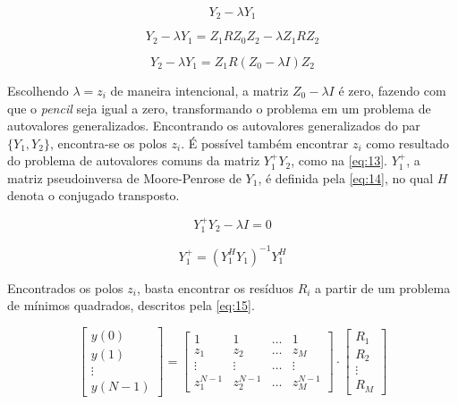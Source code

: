 \documentclass[12pt]{article}
\begin{document}
\begin{equation} \label{eq:10}
    Y_2 - \lambda Y_1
\end{equation}

\begin{equation} \label{eq:11}
    Y_2 - \lambda Y_1 = Z_1 R Z_0 Z_2 - \lambda Z_1 R Z_2
\end{equation}

\begin{equation} \label{eq:12}
    Y_2 - \lambda Y_1 = Z_1 R (Z_0 - \lambda I) Z_2
\end{equation}

Escolhendo $\lambda = z_i$ de maneira intencional, a matriz $Z_0 - \lambda I$ é zero, fazendo com que o \textit{pencil} seja igual a zero, transformando o problema em um problema de autovalores generalizados. 
Encontrando os autovalores generalizados do par $\{Y_1, Y_2\}$, encontra-se os polos $z_i$. É possível também encontrar $z_i$ como resultado do problema de autovalores comuns da matriz $Y_1^+ Y_2$, como na
\autoref{eq:13}. $Y_1^+$, a matriz pseudoinversa de Moore-Penrose de $Y_1$, é definida pela \autoref{eq:14}, no qual $H$ denota o conjugado transposto. 

\begin{equation} \label{eq:13}
    Y_1^+ Y_2 - \lambda I = 0
\end{equation}

\begin{equation} \label{eq:14}
    Y_1^+= (Y_1^H Y_1)^{-1}Y_1^H
\end{equation}

Encontrados os polos $z_i$, basta encontrar os resíduos $R_i$ a partir de um problema de mínimos quadrados, descritos pela \autoref{eq:15}.

\begin{equation} \label{eq:15}
    \begin{bmatrix} y(0) \\
    y(1) \\
    \vdots \\
    y(N-1)
    \end{bmatrix} = 
    \begin{bmatrix} 1 & 1 & \dots & 1 \\
    z_1 & z_2 & \dots & z_M \\
    \vdots & \vdots & \dots & \vdots \\
    z_1^{N-1} & z_2^{N-1} & \dots & z_M^{N-1}
    \end{bmatrix} \cdot 
    \begin{bmatrix}
    R_1 \\
    R_2 \\
    \vdots \\
    R_{M}
    \end{bmatrix}
\end{equation}
\end{document}
